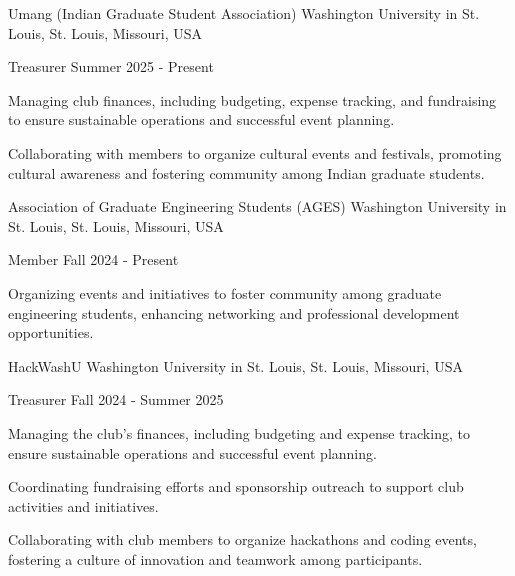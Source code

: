 \documentclass[10pt, letterpaper]{article}
\begin{document}
\begin{leadershipentry}
  {Umang (Indian Graduate Student Association)} %
  {Washington University in St. Louis, St. Louis, Missouri, USA} %
  \begin{positionentry}
    {Treasurer} %
    {Summer 2025 - Present} %
    \item Managing club finances, including budgeting, expense tracking, and fundraising to ensure sustainable operations and successful event planning.
    \item Collaborating with members to organize cultural events and festivals, promoting cultural awareness and fostering community among Indian graduate students.
  \end{positionentry}
\end{leadershipentry}

\begin{leadershipentry}
  {Association of Graduate Engineering Students (AGES)} %
  {Washington University in St. Louis, St. Louis, Missouri, USA} %
  \begin{positionentry}
    {Member} %
    {Fall 2024 - Present} %
    \item Organizing events and initiatives to foster community among graduate engineering students, enhancing networking and professional development opportunities.
  \end{positionentry}
\end{leadershipentry}

\begin{leadershipentry}
  {HackWashU} %
  {Washington University in St. Louis, St. Louis, Missouri, USA} %
  \begin{positionentry}
    {Treasurer} %
    {Fall 2024 - Summer 2025} %
    \item Managing the club's finances, including budgeting and expense tracking, to ensure sustainable operations and successful event planning.
    \item Coordinating fundraising efforts and sponsorship outreach to support club activities and initiatives.
    \item Collaborating with club members to organize hackathons and coding events, fostering a culture of innovation and teamwork among participants.
  \end{positionentry}
\end{leadershipentry}
\end{document}
